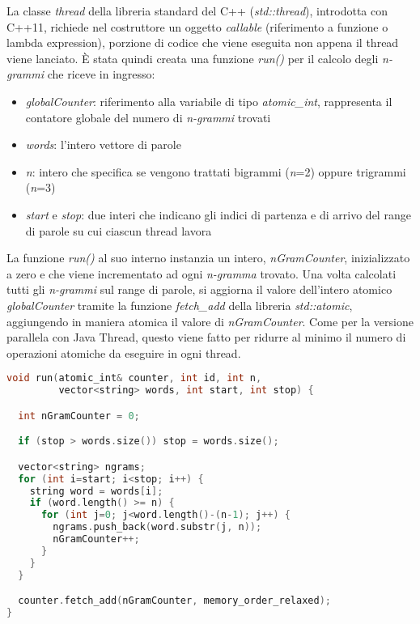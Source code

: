 \documentclass[10pt,twocolumn,letterpaper]{article}
\begin{document}
La classe \textit{thread} della libreria standard del C++ (\textit{std::thread}), introdotta con C++11, richiede nel costruttore un oggetto \textit{callable} (riferimento a funzione o lambda expression), porzione di codice che viene eseguita non appena il thread viene lanciato.
È stata quindi creata una funzione \textit{run()} per il calcolo degli \textit{n-grammi} che riceve in ingresso:
\begin{itemize}
	\item \textit{globalCounter}: riferimento alla variabile di tipo \textit{atomic\_int}, rappresenta il contatore globale del numero di \textit{n-grammi} trovati
	\item \textit{words}: l'intero vettore di parole
	\item \textit{n}: intero che specifica se vengono trattati bigrammi (\textit{n}=2) oppure trigrammi (\textit{n}=3)
	\item \textit{start} e \textit{stop}: due interi che indicano gli indici di partenza e di arrivo del range di parole su cui ciascun thread lavora
\end{itemize}

La funzione \textit{run()} al suo interno instanzia un intero, \textit{nGramCounter}, inizializzato a zero e che viene incrementato ad ogni \textit{n-gramma} trovato. Una volta calcolati tutti gli \textit{n-grammi} sul range di parole, si aggiorna il valore dell'intero atomico \textit{globalCounter} tramite la funzione \textit{fetch\_add} della libreria \textit{std::atomic}, aggiungendo in maniera atomica il valore di \textit{nGramCounter}. Come per la versione parallela con Java Thread, questo viene fatto per ridurre al minimo il numero di operazioni atomiche da eseguire in ogni thread.\newline

\begin{lstlisting}[basicstyle=\scriptsize, language=C++, frame=single, caption={Esempio di funzione lanciata da un thread in C++},captionpos=b,showstringspaces=false]
void run(atomic_int& counter, int id, int n,
         vector<string> words, int start, int stop) {

  int nGramCounter = 0;

  if (stop > words.size()) stop = words.size();

  vector<string> ngrams;
  for (int i=start; i<stop; i++) {
    string word = words[i];
    if (word.length() >= n) {
      for (int j=0; j<word.length()-(n-1); j++) {
        ngrams.push_back(word.substr(j, n));
        nGramCounter++;
      }
    }
  }

  counter.fetch_add(nGramCounter, memory_order_relaxed);
}
\end{lstlisting}
\end{document}
